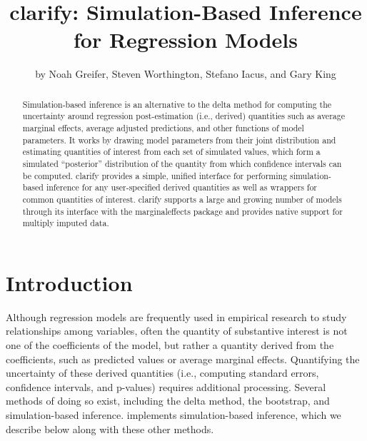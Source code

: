 \title{clarify: Simulation-Based Inference for Regression Models}


\author{by Noah Greifer, Steven Worthington, Stefano Iacus, and Gary King}

\maketitle

\begin{abstract}%
Simulation-based inference is an alternative to the delta method for computing the uncertainty around regression post-estimation (i.e., derived) quantities such as average marginal effects, average adjusted predictions, and other functions of model parameters. It works by drawing model parameters from their joint distribution and estimating quantities of interest from each set of simulated values, which form a simulated ``posterior'' distribution of the quantity from which confidence intervals can be computed. clarify provides a simple, unified interface for performing simulation-based inference for any user-specified derived quantities as well as wrappers for common quantities of interest. clarify supports a large and growing number of models through its interface with the marginaleffects package and provides native support for multiply imputed data.
\end{abstract}

\hypertarget{introduction}{%
\section{Introduction}\label{introduction}}

Although regression models are frequently used in empirical research to study relationships among variables, often the quantity of substantive interest is not one of the coefficients of the model, but rather a quantity derived from the coefficients, such as predicted values or average marginal effects. Quantifying the uncertainty of these derived quantities (i.e., computing standard errors, confidence intervals, and p-values) requires additional processing. Several methods of doing so exist, including the delta method, the bootstrap, and simulation-based inference.  implements simulation-based inference, which we describe below along with these other methods.

